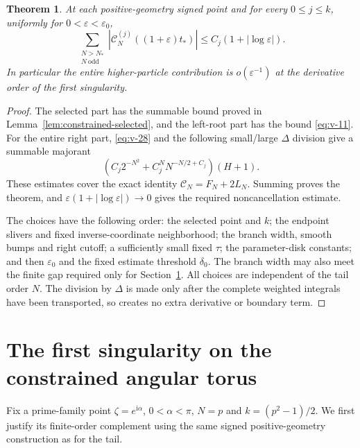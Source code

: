 \documentclass[11pt]{article}
\numberwithin{equation}{section}
\newtheorem{theorem}{Theorem}[section]
\theoremstyle{remark}\newtheorem{remark}[theorem]{Remark}
\newcommand{\ii}{\mathrm i}
\begin{document}
\begin{theorem}\label{thm:constrained-tail}
At each positive-geometry signed point and for every $0\le j\le k$, uniformly
for $0<\varepsilon<\varepsilon_0$,
\begin{equation}\label{eq:logarithmic-absolute-tail}
 \sum_{\substack{N>N_*\\N\ \mathrm{odd}}}
    |\mathcal C_N^{(j)}((1+\varepsilon)t_*)|
       \le C_j(1+|\log\varepsilon|).
\end{equation}
In particular the entire higher-particle contribution is
$o(\varepsilon^{-1})$ at the derivative order of the first
singularity.
\end{theorem}
\begin{proof}
The selected part has the summable bound proved in
Lemma~\ref{lem:constrained-selected}, and the left-root part has
the bound \eqref{eq:v-11}. For the entire right part,
\eqref{eq:v-28} and the following small/large $\Delta$ division
give a summable majorant
\[
 \left(C_j2^{-N^2}+C_j^NN^{-N/2+C_j}\right)(H+1).
\]
These estimates cover the exact identity $\mathcal C_N=F_N+2L_N$.
Summing proves the theorem, and
$\varepsilon(1+|\log\varepsilon|)\to0$ gives the required
noncancellation estimate.

The choices have the following order: the selected point and $k$;
the endpoint slivers and fixed inverse-coordinate neighborhood;
the branch width, smooth bumps and right cutoff; a sufficiently
small fixed $\tau$; the parameter-disk constants; and then
$\varepsilon_0$ and the fixed estimate threshold $\delta_0$.
The branch width may also meet the finite gap required only for
Section~\ref{sec:first-single}.
All choices are independent of the tail order $N$.
The division by $\Delta$ is made only after the complete weighted
integrals have been transported, so creates no extra derivative
or boundary term.
\end{proof}


\section{The first singularity on the constrained angular torus}
\label{sec:first-single}
Fix a prime-family point $\zeta=e^{\ii\alpha}$,
$0<\alpha<\pi$, $N=p$ and $k=(p^2-1)/2$.
We first justify its finite-order complement using the same
signed positive-geometry construction as for the tail.
\end{document}
